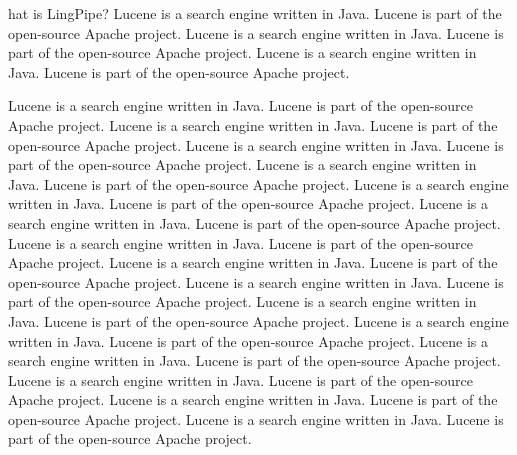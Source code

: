 %

hat is LingPipe?
Lucene is a search engine written in Java.  Lucene is part of the
open-source Apache project.
Lucene is a search engine written in Java.  Lucene is part of the
open-source Apache project.
Lucene is a search engine written in Java.  Lucene is part of the
open-source Apache project.


\noindent
Lucene is a search engine written in Java.  Lucene is part of the
open-source Apache project.
Lucene is a search engine written in Java.  Lucene is part of the
open-source Apache project.
Lucene is a search engine written in Java.  Lucene is part of the
open-source Apache project.
Lucene is a search engine written in Java.  Lucene is part of the
open-source Apache project.
Lucene is a search engine written in Java.  Lucene is part of the
open-source Apache project.
Lucene is a search engine written in Java.  Lucene is part of the
open-source Apache project.
Lucene is a search engine written in Java.  Lucene is part of the
open-source Apache project.
Lucene is a search engine written in Java.  Lucene is part of the
open-source Apache project.
Lucene is a search engine written in Java.  Lucene is part of the
open-source Apache project.
Lucene is a search engine written in Java.  Lucene is part of the
open-source Apache project.
Lucene is a search engine written in Java.  Lucene is part of the
open-source Apache project.
Lucene is a search engine written in Java.  Lucene is part of the
open-source Apache project.
Lucene is a search engine written in Java.  Lucene is part of the
open-source Apache project.
Lucene is a search engine written in Java.  Lucene is part of the
open-source Apache project.
Lucene is a search engine written in Java.  Lucene is part of the
open-source Apache project.

